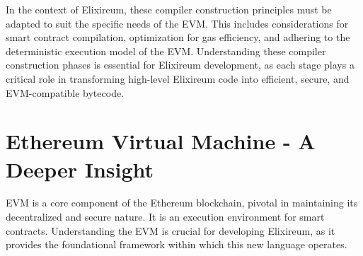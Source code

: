 In the context of Elixireum, these compiler construction principles must be adapted to suit the specific needs of the EVM. This includes considerations for smart contract compilation, optimization for gas efficiency, and adhering to the deterministic execution model of the EVM. Understanding these compiler construction phases is essential for Elixireum development, as each stage plays a critical role in transforming high-level Elixireum code into efficient, secure, and EVM-compatible bytecode.

\section{Ethereum Virtual Machine - A Deeper Insight}
\label{sec:evm_insight}

EVM is a core component of the Ethereum blockchain, pivotal in maintaining its decentralized and secure nature. It is an execution environment for smart contracts. Understanding the EVM is crucial for developing Elixireum, as it provides the foundational framework within which this new language operates.

